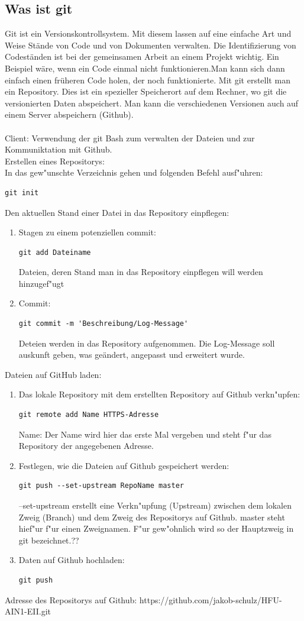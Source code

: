 \documentclass[a4paper,11pt,titlepage]{article}
\begin{document}
\subsection{Was ist git}
Git ist ein Versionskontrollsystem. Mit diesem lassen auf eine einfache Art und Weise Stände von Code und von Dokumenten verwalten. Die Identifizierung von Codeständen ist bei der gemeinsamen Arbeit an einem Projekt wichtig. Ein Beispiel wäre, wenn ein Code einmal nicht funktionieren.Man kann sich dann einfach einen früheren Code holen, der noch funktionierte. Mit git erstellt man ein Repository. Dies ist ein spezieller Speicherort auf dem Rechner, wo git die versionierten Daten abspeichert. Man kann die verschiedenen Versionen auch auf einem Server abspeichern (Github).\\
\\
Client: Verwendung der git Bash zum verwalten der Dateien und zur Kommuniktation mit Github.\\ 
Erstellen eines Repositorys:\\
In das gew"unschte Verzeichnis gehen und folgenden Befehl ausf"uhren:
\begin{verbatim}
git init
\end{verbatim}
Den aktuellen Stand einer Datei in das Repository einpflegen:
\begin{enumerate}
\item Stagen zu einem potenziellen commit:
\begin{verbatim}
git add Dateiname
\end{verbatim}
Dateien, deren Stand man in das Repository einpflegen will werden hinzugef"ugt
\item Commit:
\begin{verbatim}
git commit -m 'Beschreibung/Log-Message'
\end{verbatim}
Deteien werden in das Repository aufgenommen. Die Log-Message soll auskunft geben, was geändert, angepasst und erweitert wurde.
\end{enumerate}
Dateien auf GitHub laden:
\begin{enumerate}
\item Das lokale Repository mit dem erstellten Repository auf Github verkn"upfen:
\begin{verbatim}
git remote add Name HTTPS-Adresse
\end{verbatim}
Name: Der Name wird hier das erste Mal vergeben und steht f"ur das Repository der angegebenen Adresse.
\item Festlegen, wie die Dateien auf Github gespeichert werden:
\begin{verbatim}
git push --set-upstream RepoName master
\end{verbatim}
--set-upstream erstellt eine Verkn"upfung (Upstream) zwischen dem lokalen Zweig (Branch) und dem Zweig des Repositorys auf Github.
master steht hief"ur f"ur einen Zweignamen. F"ur gew"ohnlich wird so der Hauptzweig in git bezeichnet.??
\item Daten auf Github hochladen:
\begin{verbatim}
git push
\end{verbatim}
\end{enumerate}
Adresse des Repositorys auf Github: https://github.com/jakob-schulz/HFU-AIN1-EII.git
\end{document}

